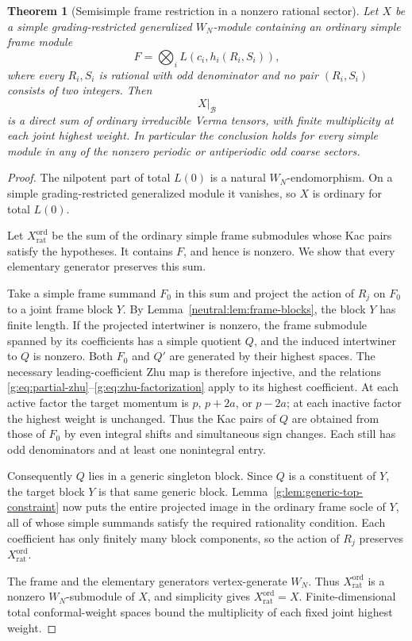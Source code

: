 \documentclass[11pt,a4paper]{article}
\numberwithin{equation}{section}
\newtheorem{theorem}{Theorem}[section]
\theoremstyle{definition}\newtheorem{definition}[theorem]{Definition}
\theoremstyle{remark}\newtheorem{remark}[theorem]{Remark}
\begin{document}
\begin{theorem}[Semisimple frame restriction in a nonzero rational sector]
\label{g:thm:generic-sector-frame-semisimple}
Let $X$ be a simple grading-restricted generalized $W_N$-module
containing an ordinary simple frame module
\[
 F=\bigotimes_iL(c_i,h_i(R_i,S_i)),
\]
where every $R_i,S_i$ is rational with odd denominator and no pair
$(R_i,S_i)$ consists of two integers.  Then
\[
       X\big|_{\mathcal B}
\]
is a direct sum of ordinary irreducible Verma tensors, with finite
multiplicity at each joint highest weight.  In particular the
conclusion holds for every simple module in any of the
nonzero periodic or antiperiodic odd coarse sectors.
\end{theorem}
\begin{proof}
The nilpotent part of total $L(0)$ is a natural $W_N$-endomorphism.
On a simple grading-restricted generalized module it vanishes, so
$X$ is ordinary for total $L(0)$.

Let $X^{\mathrm{ord}}_{\mathrm{rat}}$ be the sum of the ordinary
simple frame submodules whose Kac pairs satisfy the hypotheses.
It contains $F$, and hence is nonzero.  We show that every elementary
generator preserves this sum.

Take a simple frame summand $F_0$ in this sum and project the action
of $R_j$ on $F_0$ to a joint frame block $Y$.  By
Lemma~\ref{neutral:lem:frame-blocks}, the block $Y$ has finite
length.  If the projected intertwiner is nonzero, the frame submodule
spanned by its coefficients has a simple quotient $Q$, and the
induced intertwiner to $Q$ is nonzero.  Both $F_0$ and $Q'$ are
generated by their highest spaces.  The necessary leading-coefficient
Zhu map is therefore injective, and the relations
\eqref{g:eq:partial-zhu}--\eqref{g:eq:zhu-factorization} apply
to its highest coefficient.  At each active factor the target
momentum is $p$, $p+2a$, or $p-2a$; at each inactive factor the
highest weight is unchanged.  Thus the Kac pairs of $Q$ are
obtained from those of $F_0$ by even integral shifts and simultaneous
sign changes.  Each still has odd denominators and at least one
nonintegral entry.

Consequently $Q$ lies in a generic singleton block.  Since $Q$
is a constituent of $Y$, the target block $Y$ is that same generic
block.  Lemma~\ref{g:lem:generic-top-constraint} now puts the entire
projected image in the ordinary frame socle of $Y$, all of whose
simple summands satisfy the required rationality condition.
Each coefficient has only finitely many block components, so the
action of $R_j$ preserves $X^{\mathrm{ord}}_{\mathrm{rat}}$.

The frame and the elementary generators vertex-generate $W_N$.
Thus $X^{\mathrm{ord}}_{\mathrm{rat}}$ is a nonzero
$W_N$-submodule of $X$, and simplicity gives
$X^{\mathrm{ord}}_{\mathrm{rat}}=X$.  Finite-dimensional total
conformal-weight spaces bound the multiplicity of each fixed
joint highest weight.
\end{proof}
\end{document}
